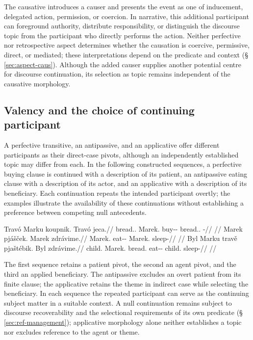 The causative introduces a causer and presents the event as one of
inducement, delegated action, permission, or coercion. In narrative, this
additional participant can foreground authority, distribute responsibility,
or distinguish the discourse topic from the participant who directly
performs the action.
Neither perfective nor retrospective aspect determines whether the causation
is coercive, permissive, direct, or mediated; these interpretations depend
on the predicate and context (§\,\ref{sec:aspect-caus}). Although the added
causer supplies another potential centre for discourse continuation, its
selection as topic remains independent of the causative morphology.

\subsection{Valency and the choice of continuing participant}
\label{sec:disc-valency-continuity}

A perfective transitive, an antipassive, and an applicative offer different
participants as their direct-case pivots, although an independently established
topic may differ from each. In the following constructed sequences, a
perfective buying clause is continued with a description of its patient, an
antipassive eating clause with a description of its actor, and an applicative
with a description of its beneficiary. Each continuation repeats the intended
participant overtly; the examples illustrate the availability of these
continuations without establishing a preference between competing null
antecedents.

\pex\label{ex:disc-valency-sequences}
\a
\begingl
\gla Travó Marku koupnik. Travó jeca.//
\glb bread.\Dir{}.\Def{} Marek.\Trs{} buy-\Trs{}-\Pf{} bread.\Dir{}.\Def{} \Exst{}-\Cont{}//
\glft {}//
\endgl
\a
\begingl
\gla Marek pjášček. Marek zdrávime.//
\glb Marek.\Dir{} eat-\Antip{}-\Pf{} Marek.\Dir{} sleep-\Prog{}//
\glft {}//
\endgl
\a
\begingl
\gla Byl Marku travě pjaštébik. Byl zdrávime.//
\glb child.\Dir{} Marek.\Trs{} bread.\Ind{} eat-\Appl{}-\Pf{} child.\Dir{} sleep-\Prog{}//
\glft {}//
\endgl
\xe

\noindent The first sequence retains a patient pivot, the second an agent
pivot, and the third an applied beneficiary. The antipassive excludes an overt
patient from its finite clause; the applicative retains the theme in indirect
case while selecting the beneficiary. In each sequence the repeated
participant can serve as the continuing subject matter in a suitable context.
A null continuation remains subject to discourse recoverability and the selectional
requirements of its own predicate (§\,\ref{sec:ref-management}); applicative
morphology alone neither establishes a topic nor excludes reference to the
agent or theme.

